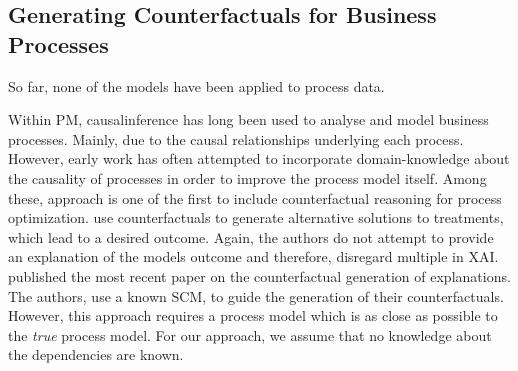 \documentclass[./../../paper.tex]{subfiles}
\begin{document}
\subsection{Generating Counterfactuals for Business Processes}
So far, none of the models have been applied to process data.

Within \gls{PM}, \gls{causalinference} has long been used to analyse and model business processes. Mainly, due to the causal relationships underlying each process. However, early work has often attempted to incorporate domain-knowledge about the causality of processes in order to improve the process model itself\autocites{shook_AssessmentUseStructural_2004,baker_ClosingLoopEmpirical_2017,hompes_DiscoveringCausalFactors_2017,wang_CounterfactualDataAugmentedSequential_2021}.
Among these, \citeauthor{narendra_CounterfactualReasoningProcess_2019} approach is one of the first to include counterfactual reasoning for process optimization\autocite{narendra_CounterfactualReasoningProcess_2019}.
\citeauthor{oberst_CounterfactualOffPolicyEvaluation_2019} use counterfactuals to generate alternative solutions to treatments, which lead to a desired outcome\autocite{oberst_CounterfactualOffPolicyEvaluation_2019}.
Again, the authors do not attempt to provide an explanation of the models outcome and therefore, disregard multiple  in \gls{XAI}. \citeauthor{qafari_CaseLevelCounterfactual_2021} published the most recent paper on the counterfactual generation of explanations\autocite{qafari_CaseLevelCounterfactual_2021}. The authors, use a known \gls{SCM}, to guide the generation of their counterfactuals. However, this approach requires a process model which is as close as possible to the \emph{true} process model. For our approach, we assume that no knowledge about the dependencies are known.
\end{document}
